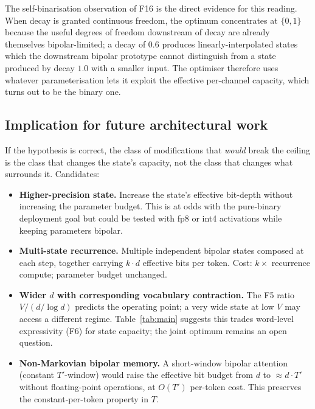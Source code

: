 \documentclass[runningheads]{llncs}
\begin{document}
The self-binarisation observation of F16 is the direct evidence for
this reading. When decay is granted continuous freedom, the optimum
concentrates at $\{0,1\}$ because the useful degrees of freedom
downstream of decay are already themselves bipolar-limited; a decay
of $0.6$ produces linearly-interpolated states which the downstream
bipolar prototype cannot distinguish from a state produced by decay
$1.0$ with a smaller input. The optimiser therefore uses whatever
parameterisation lets it exploit the effective per-channel capacity,
which turns out to be the binary one.

\subsection{Implication for future architectural work}

If the hypothesis is correct, the class of modifications that
\emph{would} break the ceiling is the class that changes the
state's capacity, not the class that changes what surrounds it.
Candidates:

\begin{itemize}
  \item \textbf{Higher-precision state.} Increase the state's
        effective bit-depth without increasing the parameter budget.
        This is at odds with the pure-binary deployment goal but
        could be tested with fp8 or int4 activations while keeping
        parameters bipolar.
  \item \textbf{Multi-state recurrence.} Multiple independent
        bipolar states composed at each step, together carrying
        $k\cdot d$ effective bits per token. Cost: $k\times$
        recurrence compute; parameter budget unchanged.
  \item \textbf{Wider $d$ with corresponding vocabulary contraction.}
        The F5 ratio $V/(d/\log d)$ predicts the operating point; a
        very wide state at low $V$ may access a different regime.
        Table~\ref{tab:main} suggests this trades word-level
        expressivity (F6) for state capacity; the joint optimum
        remains an open question.
  \item \textbf{Non-Markovian bipolar memory.} A short-window
        bipolar attention (constant $T'$-window) would raise the
        effective bit budget from $d$ to ${\approx}d\cdot T'$
        without floating-point operations, at $O(T')$ per-token
        cost. This preserves the constant-per-token property in $T$.
\end{itemize}
\end{document}

